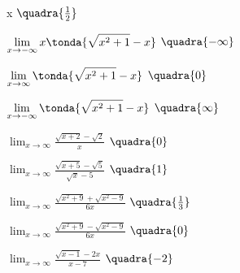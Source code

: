 \begin{esercizio}
\begin{multicols}{2}
\begin{enumeratea}
          x\)
  \hfill \(\quadra{\frac{1}{2}}\)
  \item \(\displaystyle \lim_{x \rightarrow -\infty} 
          x\tonda{\sqrt{x^2+1}-x}\)
  \hfill \(\quadra{-\infty}\)
  \item \(\displaystyle \lim_{x \rightarrow \infty} 
          \tonda{\sqrt{x^2+1}-x}\)
  \hfill \(\quadra{0}\)
  \item \(\displaystyle \lim_{x \rightarrow -\infty} 
          \tonda{\sqrt{x^2+1}-x}\)
  \hfill \(\quadra{\infty}\)
  \item \(\displaystyle \lim_{x \rightarrow \infty} 
          \frac{\sqrt{x+2}-\sqrt{2}}{x}\)
  \hfill \(\quadra{0}\)
  \item \(\displaystyle \lim_{x \rightarrow \infty} 
          \frac{\sqrt{x+5}-\sqrt{5}}{\sqrt{x}-5}\)
  \hfill \(\quadra{1}\)
  \item \(\displaystyle \lim_{x \rightarrow \infty} 
          \frac{\sqrt{x^2+9}+\sqrt{x^2-9}}{6x}\)
  \hfill \(\quadra{\frac{1}{3}}\)
  \item \(\displaystyle \lim_{x \rightarrow \infty} 
          \frac{\sqrt{x^2+9}-\sqrt{x^2-9}}{6x}\)
  \hfill \(\quadra{0}\)
  \item \(\displaystyle \lim_{x \rightarrow \infty} 
          \frac{\sqrt{x-1}-2x}{x-7}\)
  \hfill \(\quadra{-2}\)
 \end{enumeratea}
 \end{multicols}
\end{esercizio}

\begin{comment}
\subsection{Esercizi riepilogativi}

\begin{esercizio}
\label{ese:D.19}
testo esercizio
\end{esercizio}

\begin{esercizio}\label{ese:03.1}
Consegna:
 \begin{enumeratea}
  \item  
 \end{enumeratea}
\end{esercizio}
\end{comment}
